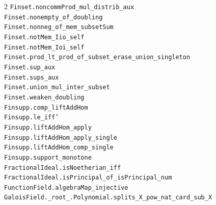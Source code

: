 \documentclass[10pt,a4paper]{article}
\begin{document}
\begin{multicols}{2}
\texttt{Finset.\allowbreak{}noncommProd\_mul\_distrib\_aux} \\
\texttt{Finset.\allowbreak{}nonempty\_of\_doubling} \\
\texttt{Finset.\allowbreak{}nonneg\_of\_mem\_subsetSum} \\
\texttt{Finset.\allowbreak{}notMem\_Iio\_self} \\
\texttt{Finset.\allowbreak{}notMem\_Ioi\_self} \\
\texttt{Finset.\allowbreak{}prod\_lt\_prod\_of\_subset\_erase\_union\_singleton} \\
\texttt{Finset.\allowbreak{}sup\_aux} \\
\texttt{Finset.\allowbreak{}sups\_aux} \\
\texttt{Finset.\allowbreak{}union\_mul\_inter\_subset} \\
\texttt{Finset.\allowbreak{}weaken\_doubling} \\
\texttt{Finsupp.\allowbreak{}comp\_liftAddHom} \\
\texttt{Finsupp.\allowbreak{}le\_iff'} \\
\texttt{Finsupp.\allowbreak{}liftAddHom\_apply} \\
\texttt{Finsupp.\allowbreak{}liftAddHom\_apply\_single} \\
\texttt{Finsupp.\allowbreak{}liftAddHom\_comp\_single} \\
\texttt{Finsupp.\allowbreak{}support\_monotone} \\
\texttt{FractionalIdeal.\allowbreak{}isNoetherian\_iff} \\
\texttt{FractionalIdeal.\allowbreak{}isPrincipal\_of\_isPrincipal\_num} \\
\texttt{FunctionField.\allowbreak{}algebraMap\_injective} \\
\texttt{GaloisField.\allowbreak{}\_root\_.\allowbreak{}Polynomial.\allowbreak{}splits\_X\_pow\_nat\_card\_sub\_X} \\

\end{multicols}
\end{document}
